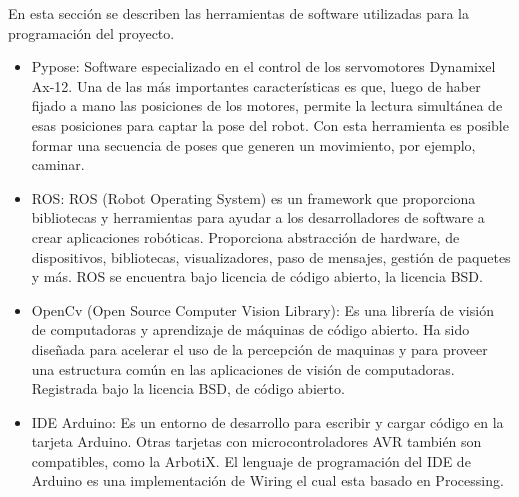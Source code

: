 En esta sección se describen las herramientas de software utilizadas para la programación del proyecto.
\begin{itemize}
\item Pypose: Software especializado en el control de los servomotores Dynamixel Ax-12. Una de las más importantes
características es que, luego de haber fijado a mano las posiciones de los motores, permite la lectura simultánea de esas
posiciones para captar la pose del robot. Con esta herramienta es posible formar una secuencia de poses que generen un
movimiento, por ejemplo, caminar. \cite{pypose}

\item ROS: ROS (Robot Operating System) es un framework que proporciona bibliotecas y herramientas para ayudar a los desarrolladores de software a crear aplicaciones robóticas. Proporciona abstracción de hardware,  de dispositivos, bibliotecas, visualizadores, paso de mensajes, gestión de paquetes y más. ROS se encuentra bajo licencia de código abierto, la licencia BSD.

\item OpenCv (Open Source Computer Vision Library): Es una librería de visión de computadoras y aprendizaje de máquinas de código abierto. Ha sido diseñada para acelerar el uso de la percepción de maquinas y para proveer una estructura común en las aplicaciones de visión de computadoras. Registrada bajo la licencia BSD, de código abierto. \cite{opencv}

\item IDE Arduino: Es un entorno de desarrollo para escribir y cargar código en la tarjeta Arduino. Otras tarjetas
con microcontroladores AVR también son compatibles, como la ArbotiX. El lenguaje de programación del IDE de Arduino es una
implementación de Wiring el cual esta basado en Processing.  \cite{arduino}

\end{itemize}